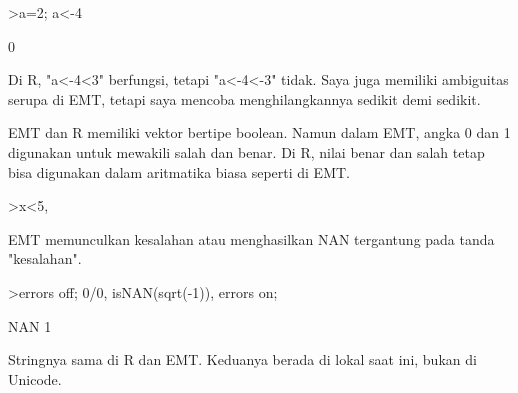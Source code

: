\documentclass[a4paper,10pt]{article}
\begin{document}
\begin{eulernotebook}
\begin{eulercomment}
\begin{eulercomment}
\begin{eulercomment}
\begin{eulercomment}
\begin{eulercomment}
\begin{eulercomment}
\begin{eulerprompt}
>a=2; a<-4
\end{eulerprompt}
\begin{euleroutput}
  0
\end{euleroutput}
\begin{eulercomment}
Di R, "a\textless{}-4\textless{}3" berfungsi, tetapi "a\textless{}-4\textless{}-3" tidak. Saya juga memiliki
ambiguitas serupa di EMT, tetapi saya mencoba menghilangkannya sedikit
demi sedikit.

EMT dan R memiliki vektor bertipe boolean. Namun dalam EMT, angka 0
dan 1 digunakan untuk mewakili salah dan benar. Di R, nilai benar dan
salah tetap bisa digunakan dalam aritmatika biasa seperti di EMT.
\end{eulercomment}
\begin{eulerprompt}
>x<5, %
\end{eulerprompt}
\begin{euleroutput}
  [0,  0,  1,  0,  0]
  [0,  0,  3.1,  0,  0]
\end{euleroutput}
\begin{eulercomment}
EMT memunculkan kesalahan atau menghasilkan NAN tergantung pada tanda
"kesalahan".
\end{eulercomment}
\begin{eulerprompt}
>errors off; 0/0, isNAN(sqrt(-1)), errors on;
\end{eulerprompt}
\begin{euleroutput}
  NAN
  1
\end{euleroutput}
\begin{eulercomment}
Stringnya sama di R dan EMT. Keduanya berada di lokal saat ini, bukan
di Unicode.


\end{eulercomment}
\end{eulercomment}
\end{eulercomment}
\end{eulercomment}
\end{eulercomment}
\end{eulercomment}
\end{eulercomment}
\end{eulernotebook}
\end{document}
